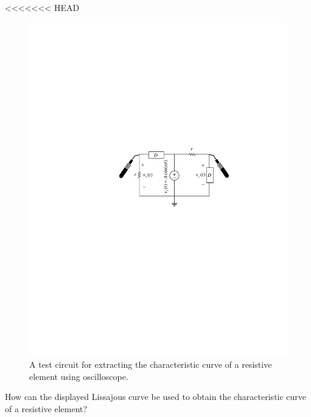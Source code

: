 \documentclass[11pt]{article}
\begin{document}

\begin{question}

<<<<<<< HEAD

\begin{figure}[H]
\centering
\includegraphics[scale=1.2,angle=0]{Fig/cir3.pdf}
\caption{A test circuit for extracting the characteristic curve of a resistive element using oscilloscope.} \label{fig:cir3}
\end{figure}

\begin{subquestion}{How can the displayed Lissajous curve be used
to obtain the characteristic curve of a resistive element?} 
\answer{}
\end{subquestion}


\end{question}
\end{document}
